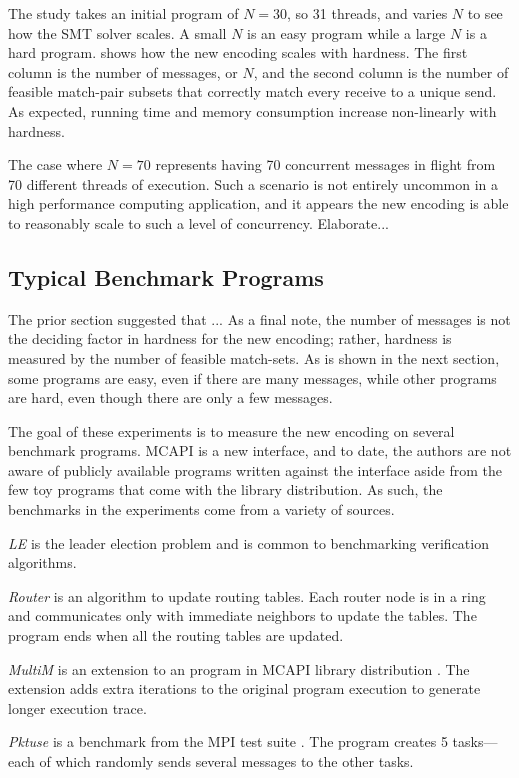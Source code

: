 The study takes an initial program of $N = 30$, so 31 threads, and varies $N$ to see how the SMT solver scales. A small $N$ is an easy program while a large $N$ is a hard program.  shows how the new encoding scales with hardness. The first column is the number of messages, or $N$, and the second column is the number of feasible match-pair subsets that correctly match every receive to a unique send. As expected, running time and memory consumption increase non-linearly with hardness. 

The case where $N=70$ represents having 70 concurrent messages in flight from 70 different threads of execution. Such a scenario is not entirely uncommon in a high performance computing application, and it appears the new encoding is able to reasonably scale to such a level of concurrency. Elaborate...

\subsection{Typical Benchmark Programs}
The prior section suggested that ... As a final note, the number of messages is not the deciding factor in hardness for the new encoding; rather, hardness is measured by the number of feasible match-sets. As is shown in the next section, some programs are easy, even if there are many messages, while other programs are hard, even though there are only a few messages.

The goal of these experiments is to measure the new encoding on several benchmark programs. MCAPI is a new interface, and to date, the authors are not aware of publicly available programs written against the interface aside from the few toy programs that come with the library distribution. As such, the benchmarks in the experiments come from a variety of sources. 
\begin{compactitem}
\item \textit{LE} is the leader election problem and is common to benchmarking verification algorithms. 
\item \textit{Router} is an algorithm to update routing tables. Each router node is in a ring and communicates only with immediate neighbors to update the tables. The program ends when all the routing tables are updated. 
\item \textit{MultiM} is an extension to an program in MCAPI library distribution . The extension adds extra iterations to the original program execution to generate longer execution trace. 
\item \textit{Pktuse} is a benchmark from the MPI test suite \cite{mpptest_benchmark}. The program creates 5 tasks---each of which randomly sends several messages to the other tasks.
\end{compactitem}

